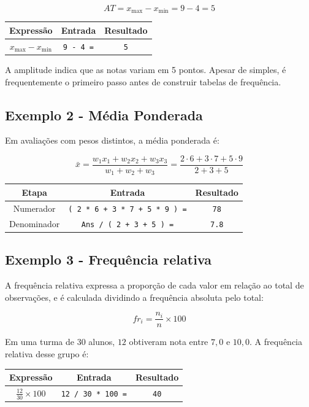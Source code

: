 \[
    AT = x_{\max} - x_{\min} = 9 - 4 = 5
\]

\begin{center}
\begin{tabular}{|c|c|c|}
    \hline
    \textbf{Expressão} & \textbf{Entrada} & \textbf{Resultado} \\
    \hline
    $x_{\max} - x_{\min}$ & \texttt{9 - 4 =} & \texttt{5} \\
    \hline
\end{tabular}
\end{center}

A amplitude indica que as notas variam em 5 pontos. Apesar de simples, é frequentemente o primeiro passo antes de construir tabelas de frequência.

\subsection*{Exemplo 2 - Média Ponderada}

Em avaliações com pesos distintos, a média ponderada é:

\[
    \bar{x} = \frac{w_1 x_1 + w_2 x_2 + w_3 x_3}{w_1 + w_2 + w_3} = \frac{2 \cdot 6 + 3 \cdot 7 + 5 \cdot 9}{2 + 3 + 5}
\]

\begin{center}
\begin{tabular}{|c|c|c|}
    \hline
    \textbf{Etapa} & \textbf{Entrada} & \textbf{Resultado} \\
    \hline
    Numerador & \texttt{( 2 * 6 + 3 * 7 + 5 * 9 ) =} & \texttt{78} \\
    Denominador & \texttt{Ans / ( 2 + 3 + 5 ) =} & \texttt{7.8} \\
    \hline
\end{tabular}
\end{center}

\subsection*{Exemplo 3 - Frequência relativa}

A frequência relativa expressa a proporção de cada valor em relação ao total de observações, e é calculada dividindo a frequência absoluta pelo total:

\[
    fr_i = \frac{n_i}{n} \times 100
\]

Em uma turma de $30$ alunos, $12$ obtiveram nota entre $7{,}0$ e $10{,}0$. A frequência relativa desse grupo é:

\begin{center}
\begin{tabular}{|c|c|c|}
    \hline
    \textbf{Expressão} & \textbf{Entrada} & \textbf{Resultado} \\
    \hline
    $\frac{12}{30} \times 100$ & \texttt{12 / 30 * 100 =} & \texttt{40} \\
    \hline
\end{tabular}
\end{center}